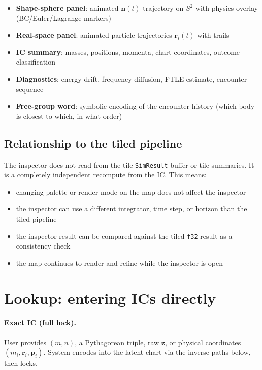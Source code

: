 \documentclass[11pt]{report}
\begin{document}
\begin{itemize}[nosep]
\item \textbf{Shape-sphere panel}: animated $\mathbf n(t)$ trajectory on $S^2$ with physics overlay (BC/Euler/Lagrange markers)
\item \textbf{Real-space panel}: animated particle trajectories $\mathbf r_i(t)$ with trails
\item \textbf{IC summary}: masses, positions, momenta, chart coordinates, outcome classification
\item \textbf{Diagnostics}: energy drift, frequency diffusion, FTLE estimate, encounter sequence
\item \textbf{Free-group word}: symbolic encoding of the encounter history (which body is closest to which, in what order)
\end{itemize}

\subsection{Relationship to the tiled pipeline}

The inspector does not read from the tile \texttt{SimResult} buffer or tile summaries. It is a completely independent recompute from the IC. This means:

\begin{itemize}[nosep]
\item changing palette or render mode on the map does not affect the inspector
\item the inspector can use a different integrator, time step, or horizon than the tiled pipeline
\item the inspector result can be compared against the tiled \texttt{f32} result as a consistency check
\item the map continues to render and refine while the inspector is open
\end{itemize}

\section{Lookup: entering ICs directly}
\label{sec:lookup}

\paragraph{Exact IC (full lock).} User provides $(m,n)$, a Pythagorean triple, raw $\mathbf z$, or physical coordinates $(m_i,\mathbf r_i,\mathbf p_i)$. System encodes into the latent chart via the inverse paths below, then locks.
\end{document}
